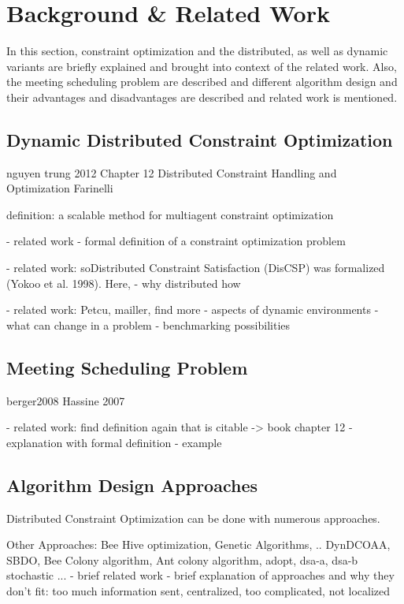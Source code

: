 \chapter{Background \& Related Work}

In this section, constraint optimization and the distributed, as well as dynamic variants are briefly explained and brought into context of the related work. Also, the meeting scheduling problem are described and different algorithm design and their advantages and disadvantages are described and related work is mentioned.
    
\section{Dynamic Distributed Constraint Optimization}

\cite{Chapman2011}
nguyen trung 2012
Chapter 12 Distributed Constraint Handling and Optimization Farinelli

definition: a scalable method for multiagent constraint optimization


    - related work
    - formal definition of a constraint optimization problem
    
    - related work: soDistributed Constraint Satisfaction (DisCSP) was formalized (Yokoo et al. 1998). Here,
    - why distributed how
    
    - related work: Petcu, mailler, find more
    - aspects of dynamic environments
    - what can change in a problem
    - benchmarking possibilities

\section{Meeting Scheduling Problem}  

    \cite{Angulo2007}
    \cite{Maheswaran} %
    berger2008
    Hassine 2007
    

    - related work: find definition again that is citable -> book chapter 12
    - explanation with formal definition
    - example

\section{Algorithm Design Approaches}

    Distributed Constraint Optimization can be done with numerous approaches.

    Other Approaches: Bee Hive optimization, Genetic Algorithms, .. DynDCOAA, SBDO, Bee Colony algorithm, Ant colony algorithm, adopt, dsa-a, dsa-b stochastic ...
    - brief related work
    - brief explanation of approaches and why they don't fit: too much information sent, centralized, too complicated, not localized
    
